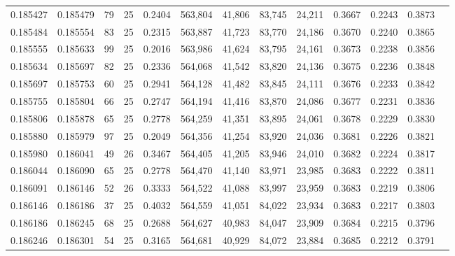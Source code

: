 \begin{tabular}{rrrrrrrrrrrrr}
0.185427 & 0.185479 &  79 &  25 &                                     0.2404 & 563,804 &  41,806 &  83,745 &  24,211 & 0.3667 & 0.2243 & 0.3873 \\
0.185484 & 0.185554 &  83 &  25 &                                     0.2315 & 563,887 &  41,723 &  83,770 &  24,186 & 0.3670 & 0.2240 & 0.3865 \\
0.185555 & 0.185633 &  99 &  25 &                                     0.2016 & 563,986 &  41,624 &  83,795 &  24,161 & 0.3673 & 0.2238 & 0.3856 \\
0.185634 & 0.185697 &  82 &  25 &                                     0.2336 & 564,068 &  41,542 &  83,820 &  24,136 & 0.3675 & 0.2236 & 0.3848 \\
0.185697 & 0.185753 &  60 &  25 &                                     0.2941 & 564,128 &  41,482 &  83,845 &  24,111 & 0.3676 & 0.2233 & 0.3842 \\
0.185755 & 0.185804 &  66 &  25 &                                     0.2747 & 564,194 &  41,416 &  83,870 &  24,086 & 0.3677 & 0.2231 & 0.3836 \\
0.185806 & 0.185878 &  65 &  25 &                                     0.2778 & 564,259 &  41,351 &  83,895 &  24,061 & 0.3678 & 0.2229 & 0.3830 \\
0.185880 & 0.185979 &  97 &  25 &                                     0.2049 & 564,356 &  41,254 &  83,920 &  24,036 & 0.3681 & 0.2226 & 0.3821 \\
0.185980 & 0.186041 &  49 &  26 &                                     0.3467 & 564,405 &  41,205 &  83,946 &  24,010 & 0.3682 & 0.2224 & 0.3817 \\
0.186044 & 0.186090 &  65 &  25 &                                     0.2778 & 564,470 &  41,140 &  83,971 &  23,985 & 0.3683 & 0.2222 & 0.3811 \\
0.186091 & 0.186146 &  52 &  26 &                                     0.3333 & 564,522 &  41,088 &  83,997 &  23,959 & 0.3683 & 0.2219 & 0.3806 \\
0.186146 & 0.186186 &  37 &  25 &                                     0.4032 & 564,559 &  41,051 &  84,022 &  23,934 & 0.3683 & 0.2217 & 0.3803 \\
0.186186 & 0.186245 &  68 &  25 &                                     0.2688 & 564,627 &  40,983 &  84,047 &  23,909 & 0.3684 & 0.2215 & 0.3796 \\
0.186246 & 0.186301 &  54 &  25 &                                     0.3165 & 564,681 &  40,929 &  84,072 &  23,884 & 0.3685 & 0.2212 & 0.3791 \\

\end{tabular}
